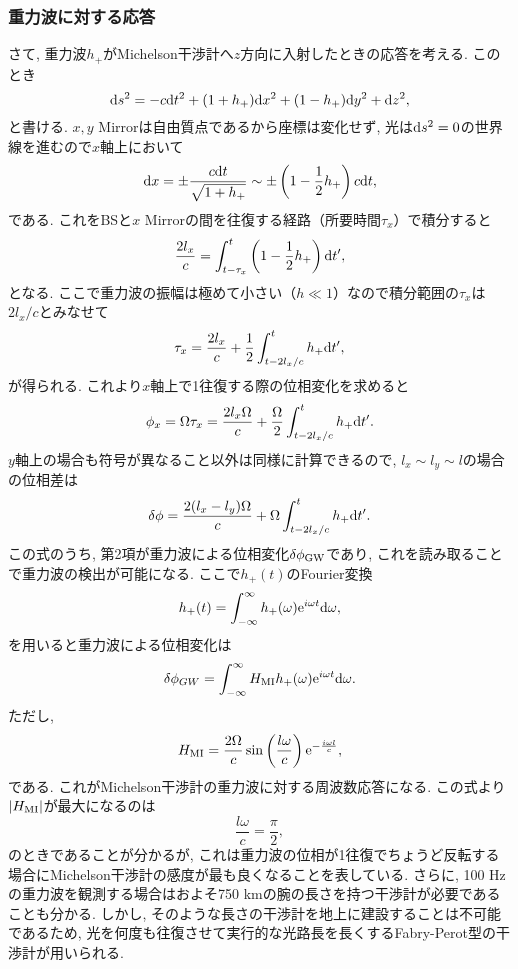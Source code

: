 \subsubsection{重力波に対する応答}
\vskip3mm
さて, 重力波$h_{+}$がMichelson干渉計へ$z$方向に入射したときの応答を考える. このとき
\begin{equation}
{\rm d}s^2=-c{\rm d}t^2+(1+h_+){\rm d}x^2+(1-h_+){\rm d}y^2+{\rm d}z^2,
\end{equation}
と書ける. $x,y$ Mirrorは自由質点であるから座標は変化せず, 光は${\rm d}s^2=0$の世界線を進むので$x$軸上において
\begin{equation}
{\rm d}x=\pm\frac{c{\rm d}t}{\sqrt{1+h_{+}}}\sim\pm\left(1-\frac{1}{2}h_+\right)c{\rm d}t,
\end{equation}
である. これをBSと$x$ Mirrorの間を往復する経路（所要時間$\tau_x$）で積分すると
\begin{equation}
\frac{2l_x}{c}=\int_{t-\tau_x}^t\left(1-\frac{1}{2}h_+\right){\rm d}t^{\prime},
\end{equation}
となる. ここで重力波の振幅は極めて小さい（$h\ll1$）なので積分範囲の$\tau_x$は$2l_x/c$とみなせて
\begin{equation}
\tau_x=\frac{2l_x}{c}+\frac{1}{2}\int_{t-2l_x/c}^th_+{\rm d}t^{\prime},
\end{equation}
が得られる. これより$x$軸上で1往復する際の位相変化を求めると
\begin{equation}
\phi_x=\Omega\tau_x=\frac{2l_x\Omega}{c}+\frac{\Omega}{2}\int_{t-2l_x/c}^th_+{\rm d}t^{\prime}.
\end{equation}
$y$軸上の場合も符号が異なること以外は同様に計算できるので, $l_x\sim l_y\sim l$の場合の位相差は
\begin{equation}
\delta\phi=\frac{2(l_x-l_y)\Omega}{c}+\Omega\int_{t-2l_x/c}^th_+{\rm d}t^{\prime}.
\end{equation}
この式のうち, 第2項が重力波による位相変化$\delta\phi_{\rm GW}$であり, これを読み取ることで重力波の検出が可能になる. ここで$h_+(t)$のFourier変換
\begin{equation}
h_+(t)=\int_{-\infty}^{\infty}h_+(\omega){\rm e}^{i\omega t}{\rm d}\omega,
\end{equation}
を用いると重力波による位相変化は
\begin{equation}
\delta\phi_{GW}=\int_{-\infty}^{\infty}H_{\rm MI}h_+(\omega){\rm e}^{i\omega t}{\rm d}\omega.
\end{equation}
ただし, 
\begin{equation}
H_{\rm MI}=\frac{2\Omega}{c}\sin\left(\frac{l\omega}{c}\right){\rm e}^{-\frac{i\omega l}{c}},
\label{eq2.58}
\end{equation}
である. これがMichelson干渉計の重力波に対する周波数応答になる. この式より$|H_{\rm MI}|$が最大になるのは
\begin{equation}
\frac{l\omega}{c}=\frac{\pi}{2},
\end{equation}
のときであることが分かるが, これは重力波の位相が1往復でちょうど反転する場合にMichelson干渉計の感度が最も良くなることを表している. さらに, 100 Hzの重力波を観測する場合はおよそ750 kmの腕の長さを持つ干渉計が必要であることも分かる. しかし, そのような長さの干渉計を地上に建設することは不可能であるため, 光を何度も往復させて実行的な光路長を長くするFabry-Perot型の干渉計が用いられる. 
